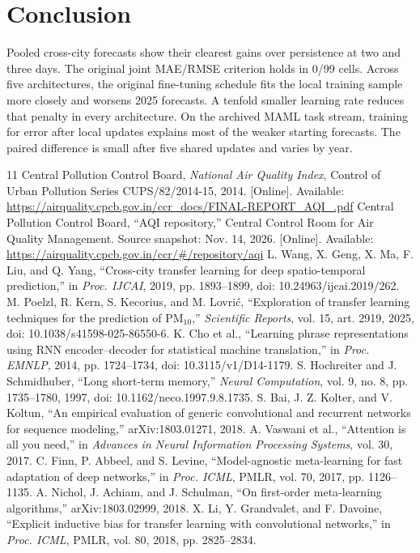 \documentclass[conference]{IEEEtran}
\begin{document}
\section{Conclusion}
Pooled cross-city forecasts show their clearest gains over persistence at two and three days. The original joint MAE/RMSE criterion holds in 0/99 cells. Across five architectures, the original fine-tuning schedule fits the local training sample more closely and worsens 2025 forecasts. A tenfold smaller learning rate reduces that penalty in every architecture. On the archived MAML task stream, training for error after local updates explains most of the weaker starting forecasts. The paired difference is small after five shared updates and varies by year.

\balance
\begin{thebibliography}{11}
 Central Pollution Control Board, \emph{National Air Quality Index}, Control of Urban Pollution Series CUPS/82/2014-15, 2014. [Online]. Available: \url{https://airquality.cpcb.gov.in/ccr_docs/FINAL-REPORT_AQI_.pdf}
 Central Pollution Control Board, ``AQI repository,'' Central Control Room for Air Quality Management. Source snapshot: Nov. 14, 2026. [Online]. Available: \url{https://airquality.cpcb.gov.in/ccr/#/repository/aqi}
 L. Wang, X. Geng, X. Ma, F. Liu, and Q. Yang, ``Cross-city transfer learning for deep spatio-temporal prediction,'' in \emph{Proc. IJCAI}, 2019, pp. 1893--1899, doi: 10.24963/ijcai.2019/262.
 M. Poelzl, R. Kern, S. Kecorius, and M. Lovri\'{c}, ``Exploration of transfer learning techniques for the prediction of PM$_{10}$,'' \emph{Scientific Reports}, vol. 15, art. 2919, 2025, doi: 10.1038/s41598-025-86550-6.
 K. Cho et al., ``Learning phrase representations using RNN encoder--decoder for statistical machine translation,'' in \emph{Proc. EMNLP}, 2014, pp. 1724--1734, doi: 10.3115/v1/D14-1179.
 S. Hochreiter and J. Schmidhuber, ``Long short-term memory,'' \emph{Neural Computation}, vol. 9, no. 8, pp. 1735--1780, 1997, doi: 10.1162/neco.1997.9.8.1735.
 S. Bai, J. Z. Kolter, and V. Koltun, ``An empirical evaluation of generic convolutional and recurrent networks for sequence modeling,'' arXiv:1803.01271, 2018.
 A. Vaswani et al., ``Attention is all you need,'' in \emph{Advances in Neural Information Processing Systems}, vol. 30, 2017.
 C. Finn, P. Abbeel, and S. Levine, ``Model-agnostic meta-learning for fast adaptation of deep networks,'' in \emph{Proc. ICML}, PMLR, vol. 70, 2017, pp. 1126--1135.
 A. Nichol, J. Achiam, and J. Schulman, ``On first-order meta-learning algorithms,'' arXiv:1803.02999, 2018.
 X. Li, Y. Grandvalet, and F. Davoine, ``Explicit inductive bias for transfer learning with convolutional networks,'' in \emph{Proc. ICML}, PMLR, vol. 80, 2018, pp. 2825--2834.
\end{thebibliography}
\end{document}
